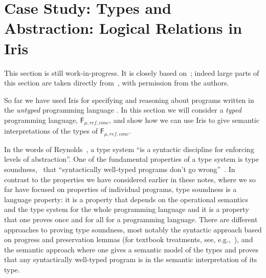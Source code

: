 \section{Case Study: Types and Abstraction: Logical Relations in Iris}
\label{sec:logical-relations}

This section is still work-in-progress. It is closely based on~\cite{timany:logrel-in-iris};
indeed large parts of this section are taken directly from~\cite{timany:logrel-in-iris},
with permission from the authors.

\newcommand{\EqTyp}{\mathsf{EqType}}
\newcommand{\TheLang}{\(\mathsf{F}_{\mu, \mathit{ref}, \mathit{conc}}\)}
\newcommand{\SAFE}{\mathit{Safe}}
\newcommand{\lectx}{\le_{\mathit{ctx}}}
\newcommand{\lelog}{\le_{\mathit{log}}}
\newcommand{\valC}{u}
\newcommand{\len}{\mathrm{length}}


\newcommand{\semVtype}[3]{ \llbracket #1 \vdash #2 \rrbracket_{#3} }
\newcommand{\semEtype}[3]{ \llbracket #1 \vdash #2 \rrbracket^{\mathcal{E}}_{#3} }
\newcommand{\semGtype}[3]{ \llbracket #1 \vdash #2 \rrbracket^{\mathcal{G}}_{#3} }

\newcommand{\cfgg}{\rho}
\newcommand{\SpecConf}{\textrm{SpecConf}}
\newcommand{\SpecCtx}{\textrm{SpecCtx}}

\renewcommand{\qedsymbol}{$\square$}

So far we have used Iris for specifying and reasoning about programs written in the
\emph{untyped} programming language \proglang. 
In this section we will consider a \emph{typed} programming language,
\TheLang,  and show how we can use Iris to give semantic interpretations
of the types of \TheLang.  

In the words of Reynolds~\cite{reynolds:types}, a type system ``is a syntactic
discipline for enforcing levels of abstraction''.
One of the fundamental properties of a type system is type
soundness, \ie\ that ``syntactically well-typed programs don't go wrong''~\cite{Milner:78}.
In contrast to the properties we have considered earlier in these
notes, where we so far have focused on properties of individual
programs, type soundness is a language property: it is a property that 
depends on the operational semantics and the type system for the whole
programming language and it is a property that one proves once and 
for all for a programming language. 
There are different approaches to proving type soundness, most notably
the syntactic approach based on progress and preservation lemmas (for
textbook treatments, see, e.g.,~\cite{pierce:tapl,harper:practical-foundations}), and 
the semantic approach where one gives a semantic model of the types 
and proves that any syntactically well-typed program is in the
semantic interpretation of its type. 


